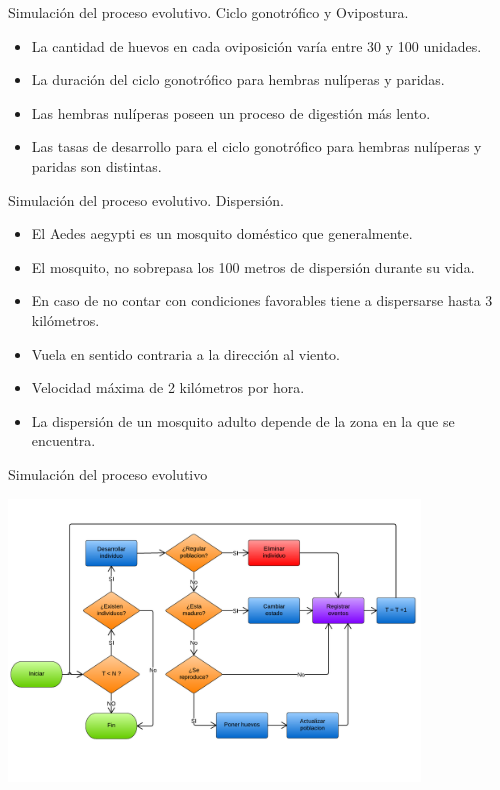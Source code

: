 \begin{frame}[t]{Simulación del proceso evolutivo. Ciclo gonotrófico y Ovipostura.}
  \begin{itemize}
    \item La cantidad de huevos en cada oviposición varía entre 30 y 100 unidades.
    \item La duración del ciclo gonotrófico para hembras nulíperas y paridas.
    \item Las hembras nulíperas poseen un proceso de digestión más lento.
    \item Las tasas de desarrollo para el ciclo gonotrófico para hembras nulíperas y paridas son distintas.
  \end{itemize}
\end{frame}


\begin{frame}[t]{Simulación del proceso evolutivo. Dispersión.}
  \begin{itemize}
    \item El Aedes aegypti es un mosquito doméstico que generalmente.
    \item El mosquito, no sobrepasa los 100 metros de dispersión durante su vida.
    \item En caso de no contar con condiciones favorables tiene a dispersarse hasta 3 kilómetros.
    \item Vuela en sentido contraria a la dirección al viento.
    \item Velocidad máxima de 2 kilómetros por hora.
    \item La dispersión de un mosquito adulto depende de la zona en la que se encuentra.
  \end{itemize}
\end{frame}


\begin{frame}[c]{Simulación del proceso evolutivo}
\begin{center}
  \includegraphics[height=7.5cm]{./graphics/algoritmo-propuesto.png}
\end{center}
\end{frame}

